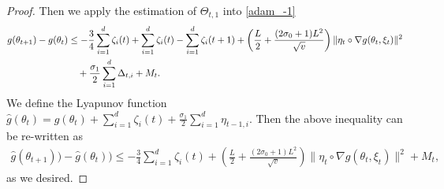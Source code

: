 \documentclass[standalone]{article}
\begin{document}
\begin{proof}
Then we apply the estimation of $\Theta_{t,1}$ into \cref{adam_-1}
\begin{align}\label{adam_16}
g(\theta_{t+1})-g(\theta_{t})& \leq -\frac{3}{4}\sum_{i=1}^{d}\zeta_{i}(t)+\sum_{i=1}^{d}\zeta_{i}(t)-\sum_{i=1}^{d}\zeta_{i}(t+1)+\left(\frac{ L}{2}+\frac{(2\sigma_{0}+1) L^{2}}{\sqrt{v}}\right)\|\eta_t\circ \nabla g(\theta_{t},\xi_{t})\|^{2}\notag\\&\quad +\frac{\sigma_{1}}{2}\sum_{i=1}^{d}\Delta_{t,i}+M_{t}.
\end{align}
We define the Lyapunov function $\hat{g}(\theta_{t}) = g(\theta_{t})+\sum_{i=1}^{d}\zeta_{i}(t)+\frac{\sigma_{1}}{2}\sum_{i=1}^{d}\eta_{{t-1},i}$. Then the above inequality can be re-written as
\begin{align}
\hat{g}(\theta_{t+1}))- \hat{g}(\theta_{t})) \le-\frac{3}{4}\sum_{i=1}^{d}\zeta_{i}(t)+\left(\frac{ L}{2}+\frac{(2\sigma_{0}+1) L^{2}}{\sqrt{v}}\right)\|\eta_t\circ \nabla g(\theta_{t},\xi_{t})\|^{2}+M_{t},
\end{align}
as we desired. 
\end{proof}
\end{document}
